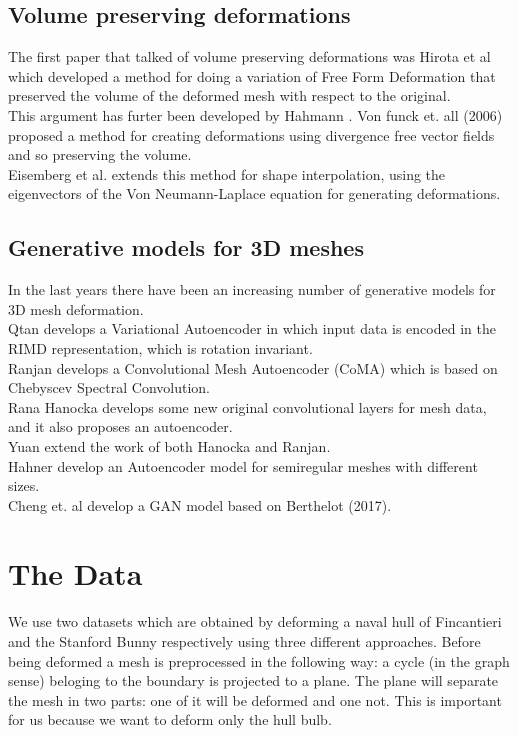 \documentclass{article}
\begin{document}
\subsection{Volume preserving deformations}
The first paper that talked of volume preserving deformations was Hirota et al \cite{hirota} which developed a method for doing a variation of Free Form Deformation that preserved the volume of the deformed mesh with respect to the original.\\
This argument has furter been developed by Hahmann \cite{hahmann}.
Von funck \cite{vonfunck} et. all (2006) proposed a method for creating deformations using divergence free vector fields and so preserving the volume.\\
Eisemberg et al. \cite{eisemberg} extends this method for shape interpolation, using the eigenvectors of the Von Neumann-Laplace equation for generating deformations. 
\subsection{Generative models for 3D meshes}
In the last years there have been an increasing number of generative models for 3D mesh deformation.\\
Qtan \cite{qtan} develops a Variational Autoencoder in which input data is encoded in the RIMD representation, which is rotation invariant.\\
Ranjan\cite{ranjan} develops a Convolutional Mesh Autoencoder (CoMA) which is based on Chebyscev Spectral Convolution.\\
Rana Hanocka \cite{hanocka} develops some new original convolutional layers for mesh data, and it also proposes an autoencoder.\\
Yuan \cite{yuan} extend the work of both Hanocka and Ranjan.\\
Hahner \cite{hahner} develop an Autoencoder model for semiregular meshes with different sizes.\\
Cheng \cite{cheng} et. al develop a GAN model based on Berthelot (2017).\\
\section{The Data}
We use two datasets which are obtained by deforming a naval hull of Fincantieri and the Stanford Bunny respectively using three different approaches.
Before being deformed a mesh is preprocessed in the following way: a  cycle (in the graph sense) beloging to the boundary is projected to a plane. The plane will separate the mesh in two parts: one of it will be deformed and one not. This is important for us because we want to deform only the hull bulb.
\end{document}

